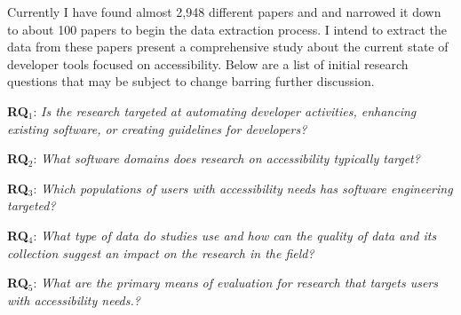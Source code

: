 Currently I have found almost 2,948 different papers and and narrowed it down to about 100 papers to begin the data extraction process. I intend to extract the data from these papers present a comprehensive study about the current state of developer tools focused on accessibility. Below are a list of initial research questions that may be subject to change barring further discussion. 

\begin{description}
  
    \item \textbf{RQ$_1$}: \textit{Is the research targeted at automating developer activities, enhancing existing software, or creating guidelines for developers?}
    \item \textbf{RQ$_2$}: \textit{What software domains does research on accessibility typically target?}
    \item \textbf{RQ$_3$}: \textit{Which populations of users with accessibility needs has software engineering targeted?}
    \item \textbf{RQ$_4$}: \textit{What type of data do studies use and how can the quality of data and its collection suggest an impact on the research in the field?}
    \item \textbf{RQ$_5$}: \textit{What are the primary means of evaluation for research that targets users with accessibility needs.?}

 \end{description}















































